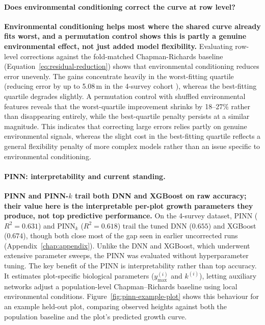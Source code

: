 \documentclass[logo,msc,ai]{infthesis}           %
\begin{document}
\paragraph*{Does environmental conditioning correct the curve at row level?}
\textbf{Environmental conditioning helps most where the shared curve already fits worst, and a permutation control shows this is partly a genuine environmental effect, not just added model flexibility.}
Evaluating row-level corrections against the fold-matched Chapman-Richards baseline (Equation~\ref{eq:residual-reduction}) shows that environmental conditioning reduces error unevenly. The gains concentrate heavily in the worst-fitting quartile (reducing error by up to 5.08\,m in the 4-survey cohort %
), whereas the best-fitting quartile degrades slightly. A permutation control with shuffled environmental features reveals that the worst-quartile improvement shrinks by 18--27\% rather than disappearing entirely, while the best-quartile penalty persists at a similar magnitude. This indicates that correcting large errors relies partly on genuine environmental signals, whereas the slight cost in the best-fitting quartile reflects a general flexibility penalty of more complex models rather than an issue specific to environmental conditioning.

\paragraph*{PINN: interpretability and current standing.}
\label{sec:rq1-pinn-limitation}
\textbf{PINN and PINN-$k$ trail both DNN and XGBoost on raw accuracy; their value here is the interpretable per-plot growth parameters they produce, not top predictive performance.}
On the 4-survey dataset, PINN ($R^2 = 0.631$) and $\text{PINN}_k$ ($R^2 = 0.618$) trail the tuned DNN ($0.655$) and XGBoost ($0.674$), though both close most of the gap seen in earlier uncorrected runs (Appendix~\ref{chap:appendix}). Unlike the DNN and XGBoost, which underwent extensive parameter sweeps, the PINN was evaluated without hyperparameter tuning. The key benefit of the PINN is interpretability rather than top accuracy. It estimates plot-specific biological parameters ($y_{\max}^{(i)}$ and $k^{(i)}$), letting auxiliary networks adjust a population-level Chapman--Richards baseline using local environmental conditions. Figure~\ref{fig:pinn-example-plot} shows this behaviour for an example held-out plot, comparing observed heights against both the population baseline and the plot's predicted growth curve.
\end{document}
